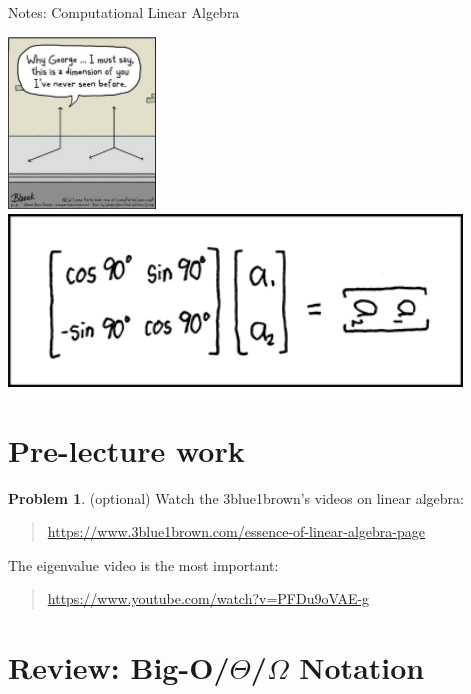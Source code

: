 \documentclass[10pt]{article}
\theoremstyle{definition}
\newtheorem{problem}{Problem}
\begin{document}
\begin{center}
\Huge
Notes: Computational Linear Algebra
\end{center}

\begin{center}
\includegraphics[height=1.8in]{comic}
\includegraphics[height=1.8in]{matrix_transform}
\end{center}


\section{Pre-lecture work}

\begin{problem}
    (optional) Watch the 3blue1brown's videos on linear algebra:
    \begin{quote}
        \url{https://www.3blue1brown.com/essence-of-linear-algebra-page}
    \end{quote}
    The eigenvalue video is the most important:
    \begin{quote}
        \url{https://www.youtube.com/watch?v=PFDu9oVAE-g}
    \end{quote}
\end{problem}


\section{Review: Big-O/$\Theta$/$\Omega$ Notation}
\end{document}
